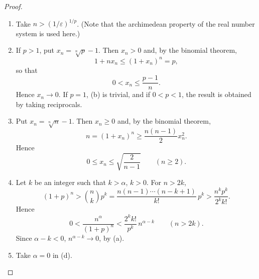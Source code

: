 \begin{proof}
\begin{enumerate}[label=(\alph*), leftmargin=2.2em, itemsep=4pt, topsep=3pt]
  \item Take $n > (1/\varepsilon)^{1/p}$. (Note that the archimedean property
        of the real number system is used here.)
  \item If $p > 1$, put $x_n = \sqrt[n]{p} - 1$. Then $x_n > 0$ and, by the
        binomial theorem,
        \[ 1 + nx_n \le (1+x_n)^n = p, \]
        so that
        \[ 0 < x_n \le \frac{p-1}{n}. \]
        Hence $x_n \to 0$. If $p = 1$, (b) is trivial, and if $0 < p < 1$, the
        result is obtained by taking reciprocals.
  \item Put $x_n = \sqrt[n]{n} - 1$. Then $x_n \ge 0$ and, by the binomial
        theorem,
        \[ n = (1+x_n)^n \ge \frac{n(n-1)}{2}x_n^2. \]
        Hence
        \[ 0 \le x_n \le \sqrt{\frac{2}{n-1}} \qquad (n \ge 2). \]
  \item Let $k$ be an integer such that $k > \alpha$, $k > 0$. For $n > 2k$,
        \[ (1+p)^n > \binom{n}{k}p^k =
           \frac{n(n-1)\cdots(n-k+1)}{k!}\,p^k > \frac{n^kp^k}{2^kk!}. \]
        Hence
        \[ 0 < \frac{n^\alpha}{(1+p)^n} < \frac{2^kk!}{p^k}\,n^{\alpha-k}
           \qquad (n > 2k). \]
        Since $\alpha - k < 0$, $n^{\alpha-k} \to 0$, by (a).
  \item Take $\alpha = 0$ in (d).
\end{enumerate}
\end{proof}
